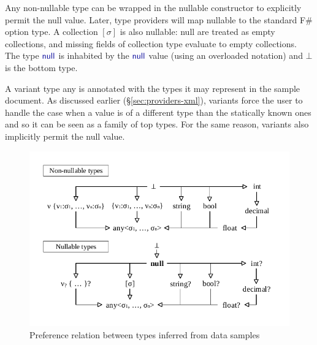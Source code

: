 \documentclass[10pt,preprint,blind,clearpagebib]{sigplanconf}
\newcommand{\kvd}[1]{\textnormal{\textcolor{kvdclr}{\sffamily #1}}}
\begin{document}
Any non-nullable type can be wrapped in the \kvd{nullable} constructor to explicitly permit the 
\kvd{null} value. Later, type providers will map \kvd{nullable} to the standard F\# option type. A collection $[\sigma]$ 
is also nullable: \kvd{null} are treated as empty collections, and missing fields of collection type
evaluate to empty collections. The type 
$\kvd{null}$ is inhabited by the $\kvd{null}$ value (using an overloaded notation) and $\bot$ 
is the bottom type.

A variant type \kvd{any} is annotated with the types it may represent in the sample document.
As discussed earlier (\S\ref{sec:providers-xml}), variants force the user to handle the case when 
a value is of a different type than the statically known ones and so it can be seen as a family of 
top types. For the same reason, variants also implicitly permit the \kvd{null} value. 


\begin{figure}
\begin{center}
\includegraphics[scale=0.80,trim=5mm 5mm 5mm 5mm,clip]{images/hierarchy.pdf} %
\end{center}
\vspace{-0.5em}
\caption{Preference relation between types inferred from data samples}
\label{fig:subtyping-diagram}
\vspace{-0.5em}
\end{figure}

\end{document}

